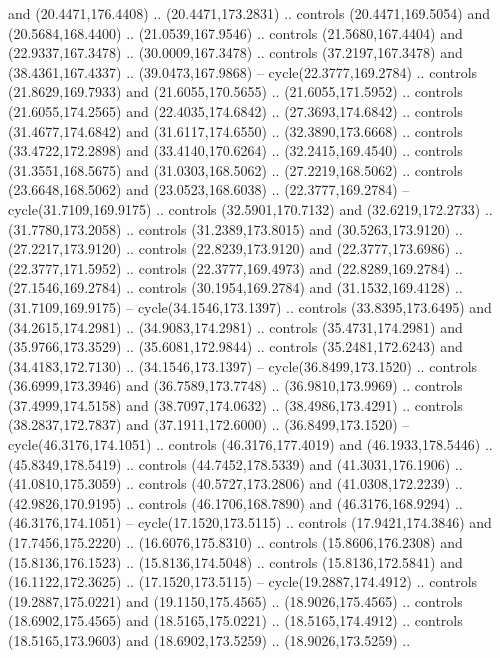 \begin{scope}[cm={{1.25,0.0,0.0,-1.25,(0.0,442.91375)}}]
    and (20.4471,176.4408) .. (20.4471,173.2831) .. controls (20.4471,169.5054)
    and (20.5684,168.4400) .. (21.0539,167.9546) .. controls (21.5680,167.4404)
    and (22.9337,167.3478) .. (30.0009,167.3478) .. controls (37.2197,167.3478)
    and (38.4361,167.4337) .. (39.0473,167.9868) -- cycle(22.3777,169.2784) ..
    controls (21.8629,169.7933) and (21.6055,170.5655) .. (21.6055,171.5952) ..
    controls (21.6055,174.2565) and (22.4035,174.6842) .. (27.3693,174.6842) ..
    controls (31.4677,174.6842) and (31.6117,174.6550) .. (32.3890,173.6668) ..
    controls (33.4722,172.2898) and (33.4140,170.6264) .. (32.2415,169.4540) ..
    controls (31.3551,168.5675) and (31.0303,168.5062) .. (27.2219,168.5062) ..
    controls (23.6648,168.5062) and (23.0523,168.6038) .. (22.3777,169.2784) --
    cycle(31.7109,169.9175) .. controls (32.5901,170.7132) and (32.6219,172.2733)
    .. (31.7780,173.2058) .. controls (31.2389,173.8015) and (30.5263,173.9120) ..
    (27.2217,173.9120) .. controls (22.8239,173.9120) and (22.3777,173.6986) ..
    (22.3777,171.5952) .. controls (22.3777,169.4973) and (22.8289,169.2784) ..
    (27.1546,169.2784) .. controls (30.1954,169.2784) and (31.1532,169.4128) ..
    (31.7109,169.9175) -- cycle(34.1546,173.1397) .. controls (33.8395,173.6495)
    and (34.2615,174.2981) .. (34.9083,174.2981) .. controls (35.4731,174.2981)
    and (35.9766,173.3529) .. (35.6081,172.9844) .. controls (35.2481,172.6243)
    and (34.4183,172.7130) .. (34.1546,173.1397) -- cycle(36.8499,173.1520) ..
    controls (36.6999,173.3946) and (36.7589,173.7748) .. (36.9810,173.9969) ..
    controls (37.4999,174.5158) and (38.7097,174.0632) .. (38.4986,173.4291) ..
    controls (38.2837,172.7837) and (37.1911,172.6000) .. (36.8499,173.1520) --
    cycle(46.3176,174.1051) .. controls (46.3176,177.4019) and (46.1933,178.5446)
    .. (45.8349,178.5419) .. controls (44.7452,178.5339) and (41.3031,176.1906) ..
    (41.0810,175.3059) .. controls (40.5727,173.2806) and (41.0308,172.2239) ..
    (42.9826,170.9195) .. controls (46.1706,168.7890) and (46.3176,168.9294) ..
    (46.3176,174.1051) -- cycle(17.1520,173.5115) .. controls (17.9421,174.3846)
    and (17.7456,175.2220) .. (16.6076,175.8310) .. controls (15.8606,176.2308)
    and (15.8136,176.1523) .. (15.8136,174.5048) .. controls (15.8136,172.5841)
    and (16.1122,172.3625) .. (17.1520,173.5115) -- cycle(19.2887,174.4912) ..
    controls (19.2887,175.0221) and (19.1150,175.4565) .. (18.9026,175.4565) ..
    controls (18.6902,175.4565) and (18.5165,175.0221) .. (18.5165,174.4912) ..
    controls (18.5165,173.9603) and (18.6902,173.5259) .. (18.9026,173.5259) ..

\end{scope}
